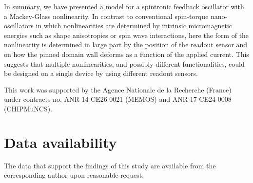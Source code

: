 \documentclass[aip,reprint,amsmath,amssymb,floatfix,superscriptaddress]{revtex4-1}
\begin{document}
In summary, we have presented a model for a spintronic feedback oscillator with a Mackey-Glass nonlinearity. In contrast to conventional spin-torque nano-oscillators in which nonlinearities are determined by intrinsic micromagnetic energies such as shape anisotropies or spin wave interactions, here the form of the nonlinearity is determined in large part by the position of the readout sensor and on how the pinned domain wall deforms as a function of the applied current. This suggests that multiple nonlinearities, and possibly different functionalities, could be designed on a single device by using different readout sensors.


\begin{acknowledgments}
This work was supported by the Agence Nationale de la Recherche (France) under contracts no. ANR-14-CE26-0021 (MEMOS) and ANR-17-CE24-0008 (CHIPMuNCS).
\end{acknowledgments}



\section*{Data availability}
The data that support the findings of this study are available from the corresponding author upon reasonable request.



\end{document}
